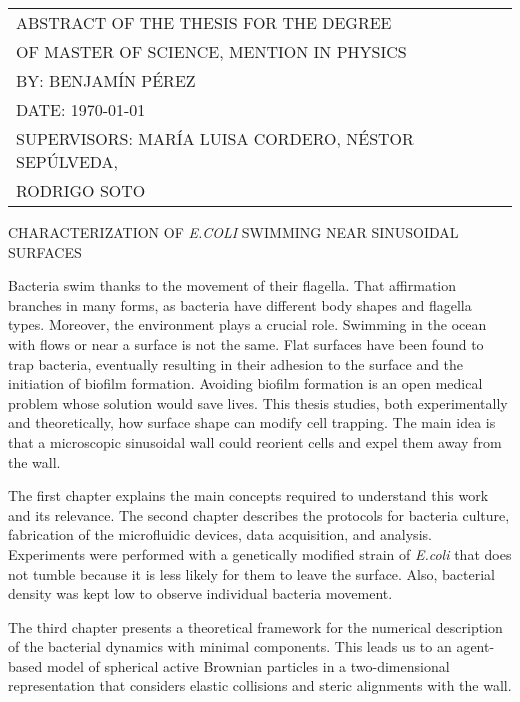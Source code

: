 \begin{adjustwidth}{4.2cm}{}
\begin{tabular}{l}
	\MakeUppercase{abstract of the thesis for the degree } \\
	\MakeUppercase{of master of science, mention in physics}\\
	BY: BENJAMÍN PÉREZ \\
	DATE: \MakeUppercase{\today} \\
	SUPERVISORS: MARÍA LUISA CORDERO, NÉSTOR SEPÚLVEDA, \\ 
    RODRIGO SOTO\\
\end{tabular}
\end{adjustwidth}

\begin{center}
    \MakeUppercase{Characterization of \textit{E.coli} swimming near sinusoidal surfaces }
\end{center}

Bacteria swim thanks to the movement of their flagella. That affirmation branches in many forms, as bacteria have different body shapes and flagella types. Moreover, the environment plays a crucial role. Swimming in the ocean with flows or near a surface is not the same. Flat surfaces have been found to trap bacteria, eventually resulting in their adhesion to the surface and the initiation of biofilm formation. Avoiding biofilm formation is an open medical problem whose solution would save lives. This thesis studies, both experimentally and theoretically, how surface shape can modify cell trapping. The main idea is that a microscopic sinusoidal wall could reorient cells and expel them away from the wall. 

The first chapter explains the main concepts required to understand this work and its relevance. The second chapter describes the protocols for bacteria culture, fabrication of the microfluidic devices, data acquisition, and analysis. Experiments were performed with a genetically modified strain of \textit{E.coli} that does not tumble because it is less likely for them to leave the surface. Also, bacterial density was kept low to observe individual bacteria movement. 

The third chapter presents a theoretical framework for the numerical description of the bacterial dynamics with minimal components. This leads us to an agent-based model of spherical active Brownian particles in a two-dimensional representation that considers elastic collisions and steric alignments with the wall.


